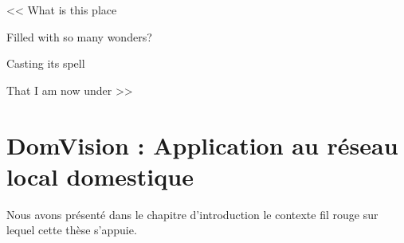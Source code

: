 \begin{savequote}[6cm]
<< What is this place

Filled with so many wonders?

Casting its spell

That I am now under >>

\end{savequote}

\chapter{DomVision : Application au réseau local domestique}
\chaptertoc
Nous avons présenté dans le chapitre d'introduction le contexte fil rouge sur lequel cette thèse s'appuie. 




